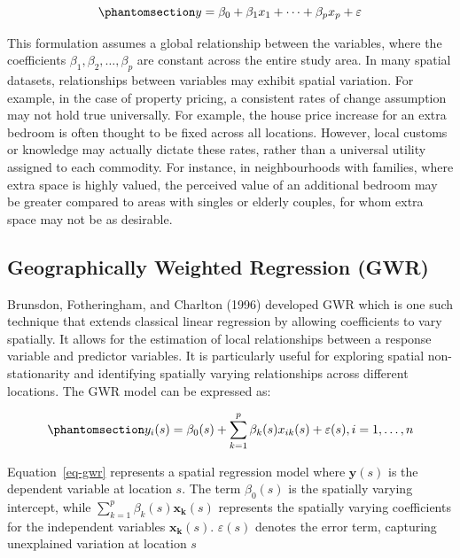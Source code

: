 \documentclass[
  default,
]{sn-jnl}
\begin{document}
\begin{equation}\phantomsection\label{eq-basicreg}{
y = \beta_0 + \beta_1x_1 + \dots + \beta_p x_p + \varepsilon
}\end{equation}

This formulation assumes a global relationship between the variables,
where the coefficients \(\beta_1,\beta_2, \dots, \beta_p\) are constant
across the entire study area. In many spatial datasets, relationships
between variables may exhibit spatial variation. For example, in the
case of property pricing, a consistent rates of change assumption may
not hold true universally. For example, the house price increase for an
extra bedroom is often thought to be fixed across all locations.
However, local customs or knowledge may actually dictate these rates,
rather than a universal utility assigned to each commodity. For
instance, in neighbourhoods with families, where extra space is highly
valued, the perceived value of an additional bedroom may be greater
compared to areas with singles or elderly couples, for whom extra space
may not be as desirable.

\subsection{Geographically Weighted Regression
(GWR)}\label{geographically-weighted-regression-gwr}

Brunsdon, Fotheringham, and Charlton (1996) developed GWR which is one
such technique that extends classical linear regression by allowing
coefficients to vary spatially. It allows for the estimation of local
relationships between a response variable and predictor variables. It is
particularly useful for exploring spatial non-stationarity and
identifying spatially varying relationships across different locations.
The GWR model can be expressed as:

\begin{equation}\phantomsection\label{eq-gwr}{
y_i(s) = \beta_{0}(s) + \sum_{k=1}^p \beta_k(s)x_{ik}(s) + \varepsilon(s), \\ i = 1,\dots, n
}\end{equation}

Equation~\ref{eq-gwr} represents a spatial regression model where
\(\mathbf{y}(s)\) is the dependent variable at location \(s\). The term
\(\beta_{0}(s)\) is the spatially varying intercept, while
\(\sum_{k=1}^p \beta_k(s)\mathbf{x_k}(s)\) represents the spatially
varying coefficients for the independent variables \(\mathbf{x_k}(s)\).
\(\varepsilon(s)\) denotes the error term, capturing unexplained
variation at location \(s\)
\end{document}
